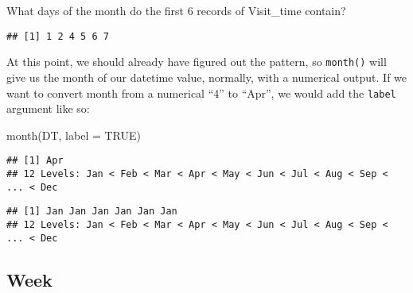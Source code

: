 \documentclass[
]{book}
\newenvironment{Shaded}{\begin{snugshade}}{\end{snugshade}}
\newcommand{\AttributeTok}[1]{\textcolor[rgb]{0.77,0.63,0.00}{#1}}
\newcommand{\ConstantTok}[1]{\textcolor[rgb]{0.00,0.00,0.00}{#1}}
\newcommand{\FunctionTok}[1]{\textcolor[rgb]{0.00,0.00,0.00}{#1}}
\newcommand{\NormalTok}[1]{#1}
\newcommand{\SpecialCharTok}[1]{\textcolor[rgb]{0.00,0.00,0.00}{#1}}
\begin{document}
What days of the month do the first 6 records of Visit\_time contain?

\begin{Shaded}
\end{Shaded}

\begin{verbatim}
## [1] 1 2 4 5 6 7
\end{verbatim}

At this point, we should already have figured out the pattern, so \texttt{month()} will give us the month of our datetime value, normally, with a numerical output. If we want to convert month from a numerical ``4'' to ``Apr'', we would add the \texttt{label} argument like so:

\begin{Shaded}
\begin{Highlighting}[]
\FunctionTok{month}\NormalTok{(DT, }\AttributeTok{label =} \ConstantTok{TRUE}\NormalTok{)}
\end{Highlighting}
\end{Shaded}

\begin{verbatim}
## [1] Apr
## 12 Levels: Jan < Feb < Mar < Apr < May < Jun < Jul < Aug < Sep < ... < Dec
\end{verbatim}

\begin{Shaded}
\end{Shaded}

\begin{verbatim}
## [1] Jan Jan Jan Jan Jan Jan
## 12 Levels: Jan < Feb < Mar < Apr < May < Jun < Jul < Aug < Sep < ... < Dec
\end{verbatim}

\hypertarget{week}{%
\subsection{Week}\label{week}}
\end{document}
